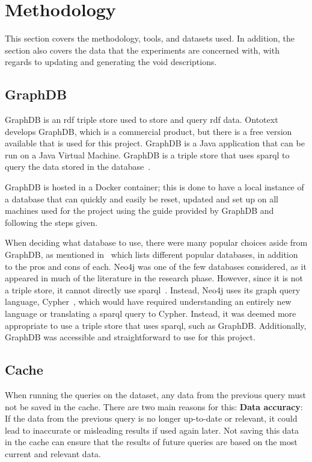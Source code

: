 \section{Methodology}\label{sec:methodology}

This section covers the methodology, tools, and datasets used. In addition, the section also covers the data that the experiments are concerned with, with regards to updating and generating the \gls{void} descriptions.

\subsection{GraphDB}\label{sec:graphdb}
GraphDB is an \gls{rdf} triple store used to store and query \gls{rdf} data. Ontotext develops GraphDB, which is a commercial product, but there is a free version available that is used for this project. GraphDB is a Java application that can be run on a Java Virtual Machine. GraphDB is a triple store that uses \gls{sparql} to query the data stored in the database~\cite{graphdb-product}.

GraphDB is hosted in a Docker container; this is done to have a local instance of a database that can quickly and easily be reset, updated and set up on all machines used for the project using the guide provided by GraphDB and following the steps given.

When deciding what database to use, there were many popular choices aside from GraphDB, as mentioned in~\cite{best-graph-databases} which lists different popular databases, in addition to the pros and cons of each. Neo4j was one of the few databases considered, as it appeared in much of the literature in the research phase. However, since it is not a triple store, it cannot directly use \gls{sparql}~\cite{neo4j:-a-reasonable-RDF-graph-database}. Instead, Neo4j uses its graph query language, Cypher~\cite{cypher-query-language}, which would have required understanding an entirely new language or translating a \gls{sparql} query to Cypher. Instead, it was deemed more appropriate to use a triple store that uses \gls{sparql}, such as GraphDB. Additionally, GraphDB was accessible and straightforward to use for this project.

\subsection{Cache}\label{sec:cache}
When running the queries on the dataset, any data from the previous query must not be saved in the cache. There are two main reasons for this:
\textbf{Data accuracy}: If the data from the previous query is no longer up-to-date or relevant, it could lead to inaccurate or misleading results if used again later. Not saving this data in the cache can ensure that the results of future queries are based on the most current and relevant data.

